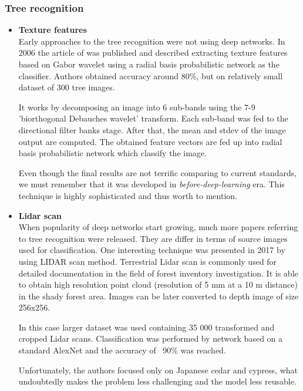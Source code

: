 \documentclass[../Main.tex]{subfiles}
\begin{document}
    \subsubsection{Tree recognition}
    \begin{itemize}
        \item \textbf{Texture features} \\
        Early approaches to the tree recognition were not using deep networks. In 2006 the article of \cite{Huang2006} was published and described extracting texture features
        based on Gabor wavelet using a radial basis probabilistic network as the classifier. Authors obtained accuracy around 80\%, but on relatively small dataset of 300 tree images. 
        
        It works by decomposing an image into 6 sub-bands using the 7-9 'biorthogonal Debauches wavelet' transform. Each sub-band was fed to the directional filter banks stage. After that, the mean and stdev of the image output are computed. The obtained feature vectors are fed up into radial basis probabilistic network which classify the image.
        
        Even though the final results are not terrific comparing to current standards, we must remember that it was developed in \textit{before-deep-learning} era. This technique is highly sophisticated and thus worth to mention.


        \item \textbf{Lidar scan} \\
        When popularity of deep networks start growing, much more papers referring to tree recognition were released. They are differ in terms of source images used for classification. One interesting technique was presented in 2017 by \cite{Lidar2017} using LIDAR scan method. Terrestrial Lidar scan is commonly used for detailed documentation in the field of forest inventory investigation. It is able to obtain high resolution point cloud (resolution of 5 mm at a 10 m distance) in the shady forest area. Images can be later converted to depth image of size 256x256.
        
        In this case larger dataset was used containing 35 000 transformed and cropped Lidar scans. Classification was performed by network based on a standard AlexNet \cite{krizhevsky-imagenet} and the accuracy of ~90\% was reached.
        
        Unfortunately, the authors focused only on Japanese cedar and cypress, what undoubtedly makes the problem less challenging and the model less reusable.


\end{itemize}
\end{document}
